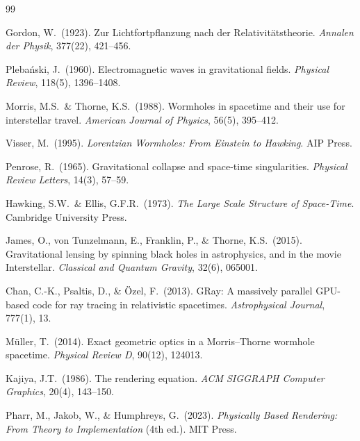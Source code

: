 \documentclass[11pt]{article}
\begin{document}
\begin{thebibliography}{99}

Gordon, W.\ (1923).
{Zur Lichtfortpflanzung nach der Relativit{\"a}tstheorie.}
\textit{Annalen der Physik}, 377(22), 421--456.

Pleba{\'n}ski, J.\ (1960).
Electromagnetic waves in gravitational fields.
\textit{Physical Review}, 118(5), 1396--1408.

Morris, M.S.\ \& Thorne, K.S.\ (1988).
Wormholes in spacetime and their use for interstellar travel.
\textit{American Journal of Physics}, 56(5), 395--412.

Visser, M.\ (1995).
\textit{Lorentzian Wormholes: From {Einstein} to {Hawking}}.
AIP Press.

Penrose, R.\ (1965).
Gravitational collapse and space-time singularities.
\textit{Physical Review Letters}, 14(3), 57--59.

Hawking, S.W.\ \& Ellis, G.F.R.\ (1973).
\textit{The Large Scale Structure of Space-Time}.
Cambridge University Press.

James, O., von Tunzelmann, E., Franklin, P., \& Thorne, K.S.\ (2015).
Gravitational lensing by spinning black holes in astrophysics,
and in the movie {Interstellar}.
\textit{Classical and Quantum Gravity}, 32(6), 065001.

Chan, C.-K., Psaltis, D., \& {\"O}zel, F.\ (2013).
{GRay}: A massively parallel {GPU}-based code for ray tracing in relativistic spacetimes.
\textit{Astrophysical Journal}, 777(1), 13.

M{\"u}ller, T.\ (2014).
Exact geometric optics in a {Morris--Thorne} wormhole spacetime.
\textit{Physical Review D}, 90(12), 124013.

Kajiya, J.T.\ (1986).
The rendering equation.
\textit{ACM SIGGRAPH Computer Graphics}, 20(4), 143--150.

Pharr, M., Jakob, W., \& Humphreys, G.\ (2023).
\textit{Physically Based Rendering: From Theory to Implementation} (4th ed.).
MIT Press.

\end{thebibliography}
\end{document}
